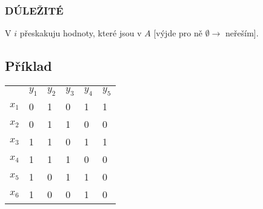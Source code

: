 \subsubsection{DÚLEŽITÉ} V $i$ přeskakuju hodnoty, které jsou v $A$ [výjde pro ně $\emptyset \rightarrow$ neřeším].

\subsection*{Příklad}
\begin{table}[H]
    \centering
    \begin{tabular}{l|lllll}
              & $y_1$ & $y_2$ & $y_3$ & $y_4$ & $y_5$ \\\hhline
        $x_1$ & 0     & 1     & 0     & 1     & 1     \\
        $x_2$ & 0     & 1     & 1     & 0     & 0     \\
        $x_3$ & 1     & 1     & 0     & 1     & 1     \\
        $x_4$ & 1     & 1     & 1     & 0     & 0     \\
        $x_5$ & 1     & 0     & 1     & 1     & 0     \\
        $x_6$ & 1     & 0     & 0     & 1     & 0
    \end{tabular}
\end{table}


